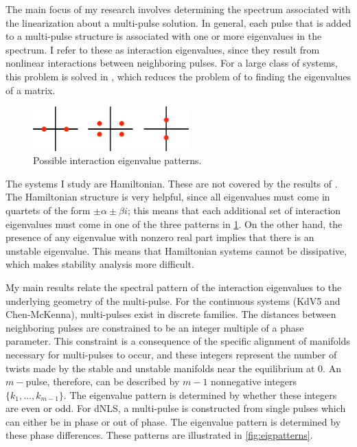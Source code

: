 \documentclass[12pt,reqno,oneside]{amsart}
\theoremstyle{definition}
\theoremstyle{remark}
\begin{document}
The main focus of my research involves determining the spectrum associated with the linearization about a multi-pulse solution. In general, each pulse that is added to a multi-pulse structure is associated with one or more eigenvalues in the spectrum. I refer to these as interaction eigenvalues, since they result from nonlinear interactions between neighboring pulses. For a large class of systems, this problem is solved in \cite{Sandstede1998}, which reduces the problem of to finding the eigenvalues of a matrix.

\begin{figure}
\includegraphics[width=6cm]{images/inteigpattern.eps}
\caption{Possible interaction eigenvalue patterns.} 
\label{fig:inteigpattern}
\end{figure}
The systems I study are Hamiltonian. These are not covered by the results of \cite{Sandstede1998}. The Hamiltonian structure is very helpful, since all eigenvalues must come in quartets of the form $\pm \alpha \pm \beta i$; this means that each additional set of interaction eigenvalues must come in one of the three patterns in \cref{fig:inteigpattern}. On the other hand, the presence of any eigenvalue with nonzero real part implies that there is an unstable eigenvalue. This means that Hamiltonian systems cannot be dissipative, which makes stability analysis more difficult.

My main results relate the spectral pattern of the interaction eigenvalues to the underlying geometry of the multi-pulse. For the continuous systems (KdV5 and Chen-McKenna), multi-pulses exist in discrete families. The distances between neighboring pulses are constrained to be an integer multiple of a phase parameter. This constraint is a consequence of the specific alignment of manifolds necessary for multi-pulses to occur, and these integers represent the number of twists made by the stable and unstable manifolds near the equilibrium at 0. An $m-$pulse, therefore, can be described by $m-1$ nonnegative integers $\{ k_1, \dots, k_{m-1} \}$. The eigenvalue pattern is determined by whether these integers are even or odd. For dNLS, a multi-pulse is constructed from single pulses which can either be in phase or out of phase. The eigenvalue pattern is determined by these phase differences. These patterns are illustrated in \cref{fig:eigpatterns}.
\end{document}
